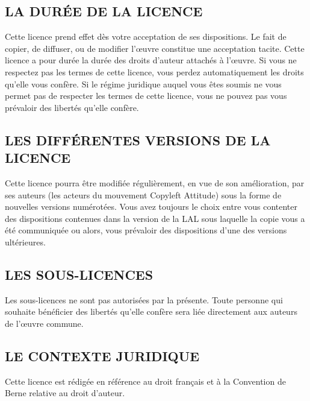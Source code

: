 \subsection{LA DUR\'EE DE LA LICENCE}
Cette licence prend effet d\`es votre acceptation de ses dispositions. Le fait de copier, de diffuser, ou de modifier l'\oe uvre constitue une acceptation tacite.
Cette licence a pour dur\'ee la dur\'ee des droits d'auteur attach\'es \`a l'\oe uvre. Si vous ne respectez pas les termes de cette licence, vous perdez automatiquement les droits qu'elle vous conf\`ere.
Si le r\'egime juridique auquel vous \^etes soumis ne vous permet pas de respecter les termes de cette licence, vous ne pouvez pas vous pr\'evaloir des libert\'es qu'elle conf\`ere.

\subsection{LES DIFF\'ERENTES VERSIONS DE LA LICENCE}
Cette licence pourra \^etre modifi\'ee r\'eguli\`erement, en vue de son am\'elioration, par ses auteurs (les acteurs du mouvement Copyleft Attitude) sous la forme de nouvelles versions num\'erot\'ees.
Vous avez toujours le choix entre vous contenter des dispositions contenues dans la version de la LAL sous laquelle la copie vous a \'et\'e communiqu\'ee ou alors, vous pr\'evaloir des dispositions d'une des versions ult\'erieures.

\subsection{LES SOUS-LICENCES}
Les sous-licences ne sont pas autoris\'ees par la pr\'esente. Toute personne qui souhaite b\'en\'eficier des libert\'es qu'elle conf\`ere sera li\'ee directement aux auteurs de l'\oe uvre commune.

\subsection{LE CONTEXTE JURIDIQUE}
Cette licence est r\'edig\'ee en r\'ef\'erence au droit fran\c{c}ais et \`a la Convention de Berne relative au droit d'auteur.
